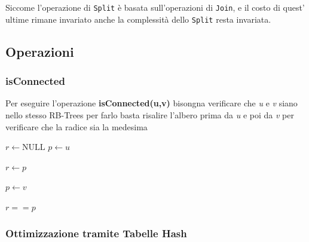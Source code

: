 Siccome l'operazione di \texttt{Split} è basata sull'operazioni 
di \texttt{Join}, e  il costo di quest' ultime rimane invariato 
anche la complessità dello \texttt{Split} resta invariata.

\subsection{Operazioni}

\subsubsection{isConnected}
Per eseguire l'operazione \textbf{isConnected(u,v)} bisongna verificare
che \textit{u} e \textit{v} siano nello stesso RB-Trees 
per farlo basta risalire l'albero prima da \textit{u} e poi da \textit{v} per verificare 
che la radice sia la medesima

\begin{algorithm}[H]
    \caption{isConnected}
    \label{alg:isConnectedEfficent}
    \SetAlgoLined
    \DontPrintSemicolon
    
    
    \BlankLine 
    $r \leftarrow \text{NULL}$\;
    $p \leftarrow u$ \;
    
    $r \leftarrow p$

    $p \leftarrow v$ \;
            
    \Return $r == p$
    
\end{algorithm}

\subsubsection{Ottimizzazione tramite Tabelle Hash}


